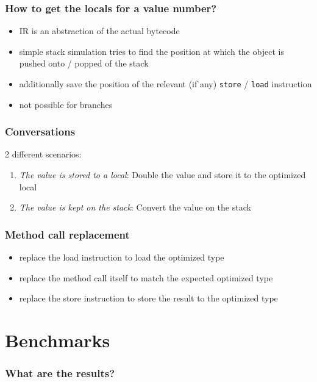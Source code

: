 \documentclass{beamer}
\begin{document}
\begin{frame}
	\frametitle{How to get the locals for a value number?}
	\begin{itemize}
    \item IR is an abstraction of the actual bytecode
    \item simple stack simulation tries to find the position at which the object is pushed onto / popped of the stack
 	  \item additionally save the position of the relevant (if any) \texttt{store} / \texttt{load} instruction 
    \item not possible for branches
	\end{itemize}
\end{frame}

\begin{frame}
  \frametitle{Conversations}  
  2 different scenarios:
  \begin{enumerate}
    \item \textit{The value is stored to a local}: Double the value and store it to the optimized local  
    \item \textit{The value is kept on the stack}: Convert the value on the stack
  \end{enumerate}
\end{frame}

\begin{frame}
  \frametitle{Method call replacement}  
  \begin{itemize}
    \item replace the load instruction to load the optimized type
    \item replace the method call itself to match the expected optimized type
    \item replace the store instruction to store the result to the optimized type
  \end{itemize}
\end{frame}

\section{Benchmarks}

\frame{\sectionpage}

\begin{frame}
  \frametitle{What are the results?}
  \begin{bchart}[step=2000,max=6000]
      \smallskip
  \end{bchart}
\end{frame}
\end{document}
